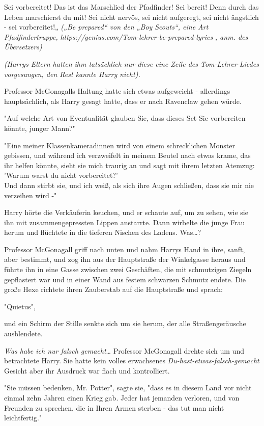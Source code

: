 {Sei vorbereitet! Das ist das Marschlied der Pfadfinder! Sei bereit! Denn durch das Leben marschierst du mit! Sei nicht nervös, sei nicht aufgeregt, sei nicht ängstlich - sei vorbereitet!„ \emph{(„Be prepared“ von den „Boy Scouts“, eine Art Pfadfindertruppe,} \emph{https://genius.com/Tom-lehrer-be-prepared-lyrics} \emph{, anm. des Übersetzers)}

\emph{(Harrys Eltern hatten ihm tatsächlich nur diese eine Zeile des Tom-Lehrer-Liedes vorgesungen, den Rest kannte Harry nicht).}

Professor McGonagalls Haltung hatte sich etwas aufgeweicht - allerdings hauptsächlich, als Harry gesagt hatte, dass er nach Ravenclaw gehen würde.

"Auf welche Art von Eventualität glauben Sie, dass dieses Set Sie vorbereiten könnte, junger Mann?"

"Eine meiner Klassenkameradinnen wird von einem schrecklichen Monster gebissen, und während ich verzweifelt in meinem Beutel nach etwas krame, das ihr helfen könnte, sieht sie mich traurig an und sagt mit ihrem letzten Atemzug:\\ 'Warum warst du nicht vorbereitet?'\\ Und dann stirbt sie, und ich weiß, als sich ihre Augen schließen, dass sie mir nie verzeihen wird -"

Harry hörte die Verkäuferin keuchen, und er schaute auf, um zu sehen, wie sie ihn mit zusammengepressten Lippen anstarrte. Dann wirbelte die junge Frau herum und flüchtete in die tieferen Nischen des Ladens. Was…?

Professor McGonagall griff nach unten und nahm Harrys Hand in ihre, sanft, aber bestimmt, und zog ihn aus der Hauptstraße der Winkelgasse heraus und führte ihn in eine Gasse zwischen zwei Geschäften, die mit schmutzigen Ziegeln gepflastert war und in einer Wand aus festem schwarzen Schmutz endete. Die große Hexe richtete ihren Zauberstab auf die Hauptstraße und sprach:

"Quietus",

und ein Schirm der Stille senkte sich um sie herum, der alle Straßengeräusche ausblendete.

\emph{Was habe ich nur falsch gemacht}… Professor McGonagall drehte sich um und betrachtete Harry. Sie hatte kein volles erwachsenes \emph{Du-hast-etwas-falsch-gemacht} Gesicht aber ihr Ausdruck war flach und kontrolliert.

"Sie müssen bedenken, Mr. Potter", sagte sie, "dass es in diesem Land vor nicht einmal zehn Jahren einen Krieg gab. Jeder hat jemanden verloren, und von Freunden zu sprechen, die in Ihren Armen sterben - das tut man nicht leichtfertig."

}

